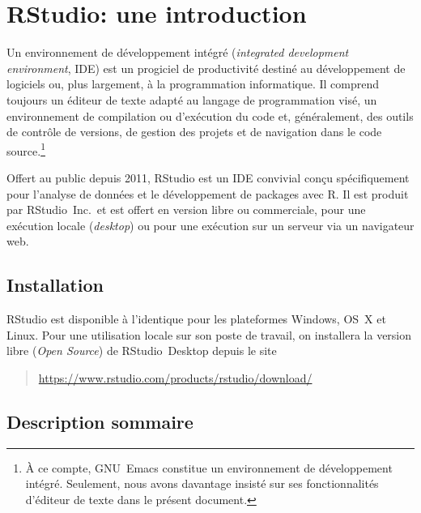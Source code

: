\chapter{RStudio: une introduction}
\label{rstudio}

Un environnement de développement intégré (\emph{integrated
  development environment}, IDE) est un progiciel de productivité
destiné au développement de logiciels ou, plus largement, à la
programmation informatique. Il comprend toujours un éditeur de texte
adapté au langage de programmation visé, un environnement de
compilation ou d'exécution du code et, généralement, des outils de
contrôle de versions, de gestion des projets et de navigation dans le
code source.\footnote{%
  À ce compte, GNU~Emacs constitue un environnement de développement
  intégré. Seulement, nous avons davantage insisté sur ses
  fonctionnalités d'éditeur de texte dans le présent document.} %

Offert au public depuis 2011, RStudio est un IDE convivial conçu
spécifiquement pour l'analyse de données et le développement de
packages avec R. Il est produit par RStudio~Inc.\ et est offert en
version libre ou commerciale, pour une exécution locale
(\emph{desktop}) ou pour une exécution sur un serveur via un
navigateur web.


\section{Installation}
\label{rstudio:installation}

RStudio est disponible à l'identique pour les plateformes Windows,
OS~X et Linux. Pour une utilisation locale sur son poste de travail,
on installera la version libre (\emph{Open Source}) de RStudio~Desktop
depuis le site
\begin{quote}
  \url{https://www.rstudio.com/products/rstudio/download/}
\end{quote}


\section{Description sommaire}
\label{rstudio:description}

